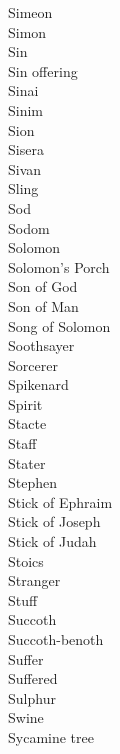 Simeon  \\
Simon  \\
Sin  \\
Sin offering  \\
Sinai  \\
Sinim  \\
Sion  \\
Sisera  \\
Sivan  \\
Sling  \\
Sod  \\
Sodom  \\
Solomon  \\
Solomon’s Porch  \\
Son of God  \\
Son of Man  \\
Song of Solomon  \\
Soothsayer  \\
Sorcerer  \\
Spikenard  \\
Spirit  \\
Stacte  \\
Staff  \\
Stater  \\
Stephen  \\
Stick of Ephraim  \\
Stick of Joseph  \\
Stick of Judah  \\
Stoics  \\
Stranger  \\
Stuff  \\
Succoth  \\
Succoth-benoth  \\
Suffer  \\
Suffered  \\
Sulphur  \\
Swine  \\
Sycamine tree  \\
